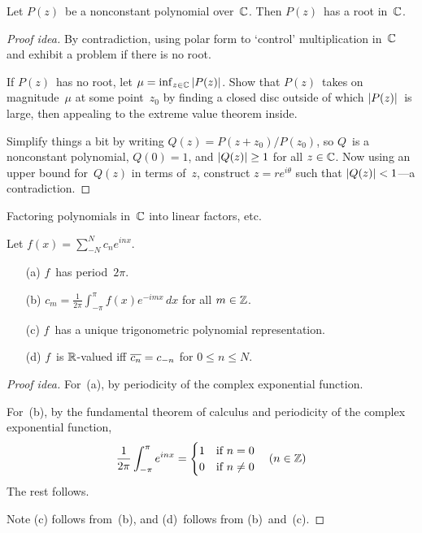 \begin{thm}
Let \(P(z)\)~be a nonconstant polynomial over~\(\mathbb{C}\). Then \(P(z)\)~has a root in~\(\mathbb{C}\).
\end{thm}
\begin{proof}[Proof idea]
By contradiction, using polar form to `control' multiplication in~\(\mathbb{C}\) and exhibit a problem if there is no root.

If \(P(z)\)~has no root, let \(\mu=\inf_{z\in\mathbb{C}}|{P(z)}|\). Show that \(P(z)\)~takes on magnitude~\(\mu\) at some point~\(z_0\) by finding a closed disc outside of which \(|{P(z)}|\)~is large, then appealing to the extreme value theorem inside.

Simplify things a bit by writing \(Q(z)=P(z+z_0)/P(z_0)\), so \(Q\)~is a nonconstant polynomial, \(Q(0)=1\), and \(|{Q(z)}|\ge1\) for all \(z\in\mathbb{C}\). Now using an upper bound for~\(Q(z)\) in terms of~\(z\), construct \(z=re^{i\theta}\) such that \(|{Q(z)}|<1\)---a contradiction.
\end{proof}
\begin{app}
Factoring polynomials in~\(\mathbb{C}\) into linear factors, etc.
\end{app}

\begin{thm}
Let \(f(x)=\sum_{-N}^N c_n e^{inx}\).
\begin{enumerate}[itemsep=0pt]
\item[(a)] \(f\)~has period~\(2\pi\).
\item[(b)] \(c_m=\frac{1}{2\pi}\int_{-\pi}^\pi f(x)e^{-imx}\,dx\) for all \(m\in\mathbb{Z}\).
\item[(c)] \(f\)~has a unique trigonometric polynomial representation.
\item[(d)] \(f\)~is \(\mathbb{R}\)-valued iff \(\overline{c_n}=c_{-n}\) for \(0\le n\le N\).
\end{enumerate}
\end{thm}
\begin{proof}[Proof idea]
For~(a), by periodicity of the complex exponential function.

For~(b), by the fundamental theorem of calculus and periodicity of the complex exponential function,
\[\frac{1}{2\pi}\int_{-\pi}^\pi e^{inx}=\begin{cases}
1&\text{if }n=0\\
0&\text{if }n\ne0
\end{cases}\quad(n\in\mathbb{Z})\]
The rest follows.

Note (c) follows from~(b), and (d)~follows from (b)~and~(c).
\end{proof}


